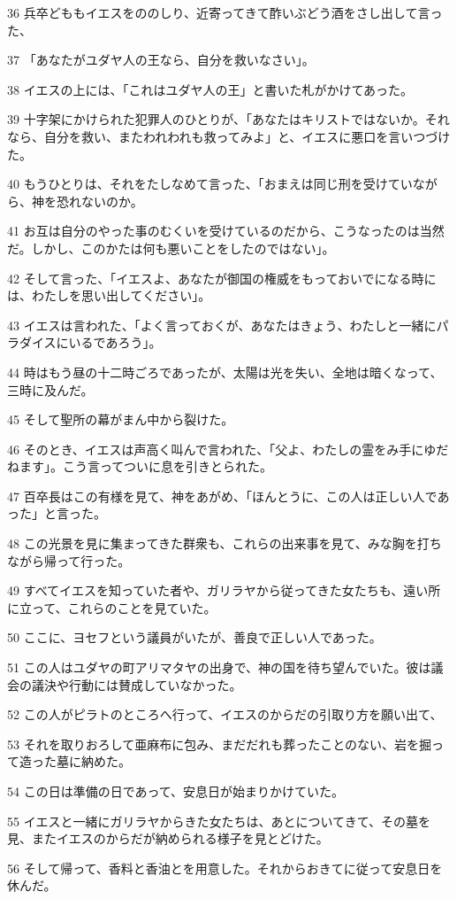 \par 36 兵卒どももイエスをののしり、近寄ってきて酢いぶどう酒をさし出して言った、
\par 37 「あなたがユダヤ人の王なら、自分を救いなさい」。
\par 38 イエスの上には、「これはユダヤ人の王」と書いた札がかけてあった。
\par 39 十字架にかけられた犯罪人のひとりが、「あなたはキリストではないか。それなら、自分を救い、またわれわれも救ってみよ」と、イエスに悪口を言いつづけた。
\par 40 もうひとりは、それをたしなめて言った、「おまえは同じ刑を受けていながら、神を恐れないのか。
\par 41 お互は自分のやった事のむくいを受けているのだから、こうなったのは当然だ。しかし、このかたは何も悪いことをしたのではない」。
\par 42 そして言った、「イエスよ、あなたが御国の権威をもっておいでになる時には、わたしを思い出してください」。
\par 43 イエスは言われた、「よく言っておくが、あなたはきょう、わたしと一緒にパラダイスにいるであろう」。
\par 44 時はもう昼の十二時ごろであったが、太陽は光を失い、全地は暗くなって、三時に及んだ。
\par 45 そして聖所の幕がまん中から裂けた。
\par 46 そのとき、イエスは声高く叫んで言われた、「父よ、わたしの霊をみ手にゆだねます」。こう言ってついに息を引きとられた。
\par 47 百卒長はこの有様を見て、神をあがめ、「ほんとうに、この人は正しい人であった」と言った。
\par 48 この光景を見に集まってきた群衆も、これらの出来事を見て、みな胸を打ちながら帰って行った。
\par 49 すべてイエスを知っていた者や、ガリラヤから従ってきた女たちも、遠い所に立って、これらのことを見ていた。
\par 50 ここに、ヨセフという議員がいたが、善良で正しい人であった。
\par 51 この人はユダヤの町アリマタヤの出身で、神の国を待ち望んでいた。彼は議会の議決や行動には賛成していなかった。
\par 52 この人がピラトのところへ行って、イエスのからだの引取り方を願い出て、
\par 53 それを取りおろして亜麻布に包み、まだだれも葬ったことのない、岩を掘って造った墓に納めた。
\par 54 この日は準備の日であって、安息日が始まりかけていた。
\par 55 イエスと一緒にガリラヤからきた女たちは、あとについてきて、その墓を見、またイエスのからだが納められる様子を見とどけた。
\par 56 そして帰って、香料と香油とを用意した。それからおきてに従って安息日を休んだ。

